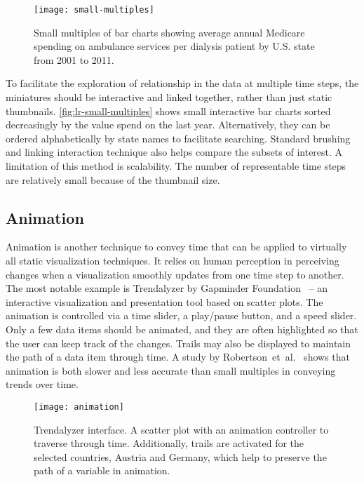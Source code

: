\begin{figure}[!htb]
	\centering
	\texttt{[image: small-multiples]}
	\caption{Small multiples of bar charts showing average annual Medicare spending on ambulance services per dialysis patient by U.S. state from 2001 to 2011. }
	\label{fig:lr-small-multiples}
\end{figure}

To facilitate the exploration of relationship in the data at multiple time steps, the miniatures should be interactive and linked together, rather than just static thumbnails. \autoref{fig:lr-small-multiples} shows small interactive bar charts sorted decreasingly by the value spend on the last year. Alternatively, they can be ordered alphabetically by state names to facilitate searching. Standard brushing and linking interaction technique also helps compare the subsets of interest. A limitation of this method is scalability. The number of representable time steps are relatively small because of the thumbnail size.

\subsection{Animation}
Animation is another technique to convey time that can be applied to virtually all static visualization techniques. It relies on human perception in perceiving changes when a visualization smoothly updates from one time step to another. The most notable example is Trendalyzer by Gapminder Foundation~\cite{Gapminder} -- an interactive visualization and presentation tool based on scatter plots. The animation is controlled via a time slider, a play/pause button, and a speed slider. Only a few data items should be animated, and they are often highlighted so that the user can keep track of the changes. Trails may also be displayed to maintain the path of a data item through time. A study by Robertson~et~al.~\cite{Robertson2008} shows that animation is both slower and less accurate than small multiples in conveying trends over time.

\begin{figure}[!htb]
	\centering
	\texttt{[image: animation]}
	\caption{Trendalyzer interface. A scatter plot with an animation controller to traverse through time. Additionally, trails are activated for the selected countries, Austria and Germany, which help to preserve the path of a variable in animation. }
	\label{fig:lr-animation}
\end{figure}


